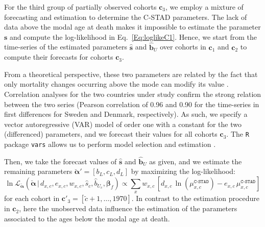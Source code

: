 \documentclass[11pt, a4paper]{article}
\begin{document}
For the third group of partially observed cohorts $\bm{c}_3$, we employ a mixture of forecasting and estimation to determine the C-STAD parameters. The lack of data above the modal age at death makes it impossible to estimate the parameter $\bm{s}$ and compute the log-likelihood in Eq.~\eqref{Eq:loglikeC1}. Hence, we start from the time-series of the estimated parameters $\hat{\bm{s}}$ and $\hat{\bm{b}}_U$ over cohorts in $\bm{c}_1$ and $\bm{c}_2$ to compute their forecasts for cohorts $\bm{c}_3$. 

From a theoretical perspective, these two parameters are related by the fact that only mortality changes occurring above the mode can modify its value \cite[cf.~Appendix B in][]{canudas2010three}. Correlation analyses for the two countries under study confirm the strong relation between the two series (Pearson correlation of 0.96 and 0.90 for the time-series in first differences for Sweden and Denmark, respectively). As such, we specify a vector autoregressive (VAR) model of order one with a constant for the two (differenced) parameters, and we forecast their values for all cohorts $\bm{c}_3$. The \texttt{R} package \texttt{vars} allows us to perform model selection and estimation \citep{pfaff2008analysis,pfaff2008var}.

Then, we take the forecast values of $\hat{\bm{s}}$ and $\hat{\bm{b}}_U$ as given, and we estimate the remaining parameters $\breve{\bm{\alpha}}'=\left[b_{L},c_{L},d_{L}\right]$ by maximizing the log-likelihood:
%
\begin{equation}\label{Eq:loglikeC3}
\ln\mathcal{L}_{\breve{\bm{\alpha}}}\left(\breve{\bm{\alpha}}\,|\,d_{x,c} , e_{x,c} , w_{x,c} , \hat{s}_{c}, \hat{b}_{U_{c}} , \bm{\beta}_{f} \right) \propto  \sum_{x} w_{x,c} \, \left[  d_{x,c} \,
\ln \left( \mu^{\texttt{C-STAD}}_{x,c}  \right) - e_{x,c}
\, \mu^{\texttt{C-STAD}}_{x,c} \right] 
\end{equation}
%
for each cohort in $\bm{c}'_3=\left[\tilde{c}+1,\ldots,1970\right]$. In contrast to the estimation procedure in $\bm{c}_2$, here the unobserved data influence the estimation of the parameters associated to the ages below the modal age at death. 
\end{document}
